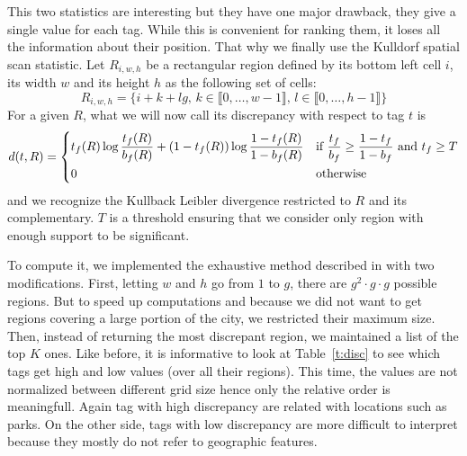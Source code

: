 This two statistics are interesting but they have one major drawback, they
give a single value for each tag. While this is convenient for ranking them,
it loses all the information about their position. That why we finally use the
Kulldorf spatial scan statistic\cite{kulldorff}. Let $R_{i,w,h}$ be a
rectangular region defined by its bottom left cell $i$, its width $w$ and its
height $h$ as the following set of cells: \[R_{i,w,h} = \{i + k + lg,\,
k\in\llbracket 0,\dots, w-1\rrbracket,\, l\in\llbracket 0,\dots,
h-1\rrbracket\}\] For a given $R$, what we will now call its discrepancy with
respect to tag $t$ is
\[
	d(t, R) =
\begin{dcases}
	t_f(R)\log\frac{t_f(R)}{b_f(R)} + (1-t_f(R))\log\frac{1-t_f(R)}{1-b_f(R)}
	& \text{if } \frac{t_f}{b_f} \geq \frac{1-t_f}{1-b_f} \text{ and } t_f \geq T\\
	0 & \text{otherwise}
\end{dcases}
\]
and we recognize the Kullback Leibler divergence restricted to $R$ and its
complementary. $T$ is a threshold ensuring that we consider only region with
enough support to be significant.

To compute it, we implemented the exhaustive method described in
\citep[Algorithm 3]{Agarwal2006spatial} with two modifications. First, letting
$w$ and $h$ go from $1$ to $g$, there are $g^2\cdot g\cdot g$ possible
regions. But to speed up computations and because we did not want to get
regions covering a large portion of the city, we restricted their maximum
size. Then, instead of returning the most discrepant region, we maintained a
list of the top $K$ ones. Like before, it is informative to look at
Table~\vref{t:disc} to see which tags get high and low values (over all their
regions). This time, the values are not normalized between different grid size
hence only the relative order is meaningfull. Again tag with high discrepancy
are related with locations such as parks. On the other side, tags with low
discrepancy are more difficult to interpret because they mostly do not refer
to geographic features.

